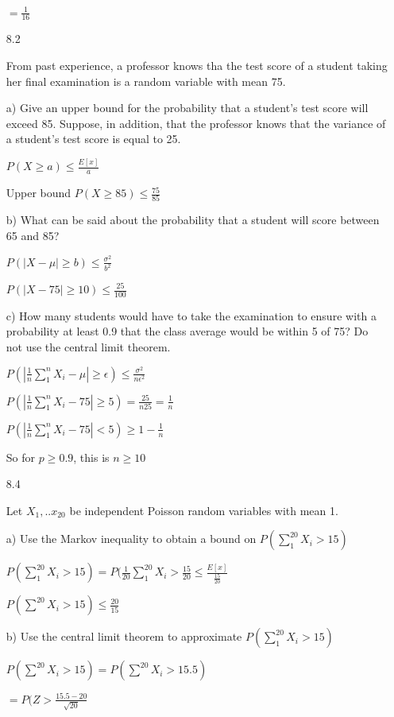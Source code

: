 \documentclass[11pt]{article}
\begin{document}
\begin{itemize}
		$=\frac{1}{16}$


	\item[8.2]

		From past experience, a professor knows tha the test 
		score of a student taking her final examination is a 
		random variable with mean 75.

		a) Give an upper bound for the probability that a 
		student's test score will exceed 85. Suppose, 
		in addition, that the professor knows that the 
		variance of a student's test score is equal to 25.

		$P(X \geq a) \leq \frac{E[x]}{a}$

		Upper bound $P(X \geq 85) \leq \frac{75}{85}$

		b) What can be said about the probability that
		a student will score between 65 and 85?

		$P(|X-\mu| \geq b)  \leq \frac{\sigma^2}{b^2}$

		$P(|X-75| \geq 10) \leq \frac{25}{100}$

		c) How many students would have to take the 
		examination to ensure with a probability at least 0.9 
		that the class average would be within 5 of 75? 
		Do not use the central limit theorem.

		$P(|\frac{1}{n} \sum_{1}^{n} X_i
		- \mu| \geq \epsilon) \leq \frac{\sigma^2}{n\epsilon^2}$

		$P(|\frac{1}{n}\sum_{1}^{n} X_i - 75| \geq 5) =
		\frac{25}{n25} = \frac{1}{n}$

		$P(|\frac{1}{n}\sum_{1}^{n} X_i - 75| < 5) \geq
		1 - \frac{1}{n}$

		So for $p \geq 0.9$, this is $n \geq 10$

	\item[8.4]
		
		Let $X_1, ..x_{20}$ be independent Poisson random 
		variables with mean 1.

		a) Use the Markov inequality to obtain a bound on
		$P(\sum_{1}^{20} X_i > 15)$

		$P(\sum_1^{20} X_i > 15) = P(\frac{1}{20}\sum_{1}^{20}X_i
		> \frac{15}{20} \leq \frac{E[x]}{\frac{15}{20}}$

		$P(\sum^{20} X_i > 15) \leq \frac{20}{15}$

		b) Use the central limit theorem to approximate
		$P(\sum_1^{20} X_i > 15)$

		$P(\sum^{20} X_i > 15) = P(\sum^{20} X_i > 15.5)$

		$=P(Z > \frac{15.5-20}{\sqrt{20}}$


\end{itemize}
\end{document}
